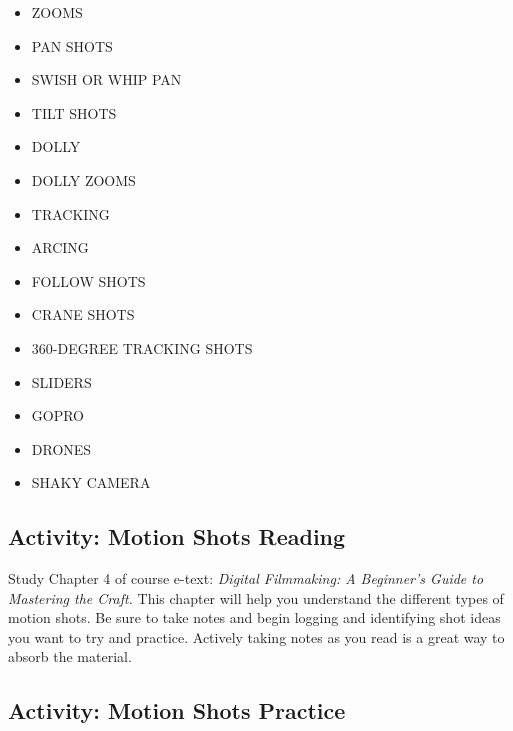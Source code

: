 \documentclass[
]{book}
\providecommand{\tightlist}{%
  \setlength{\itemsep}{0pt}\setlength{\parskip}{0pt}}
\begin{document}
\begin{itemize}
\tightlist
\item
  ZOOMS\\
\item
  PAN SHOTS\\
\item
  SWISH OR WHIP PAN\\
\item
  TILT SHOTS\\
\item
  DOLLY\\
\item
  DOLLY ZOOMS\\
\item
  TRACKING\\
\item
  ARCING\\
\item
  FOLLOW SHOTS\\
\item
  CRANE SHOTS\\
\item
  360-DEGREE TRACKING SHOTS\\
\item
  SLIDERS\\
\item
  GOPRO\\
\item
  DRONES\\
\item
  SHAKY CAMERA
\end{itemize}

\hypertarget{activity-motion-shots-reading}{%
\subsection*{Activity: Motion Shots Reading}\label{activity-motion-shots-reading}}

\begin{reflect}
Study Chapter 4 of course e-text: \emph{Digital Filmmaking: A Beginner's Guide to Mastering the Craft.} This chapter will help you understand the different types of motion shots. Be sure to take notes and begin logging and identifying shot ideas you want to try and practice. Actively taking notes as you read is a great way to absorb the material.
\end{reflect}

\hypertarget{activity-motion-shots-practice}{%
\subsection*{Activity: Motion Shots Practice}\label{activity-motion-shots-practice}}
\end{document}
